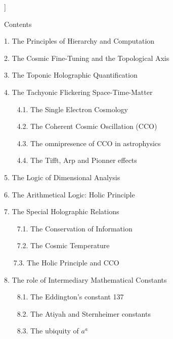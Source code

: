 \documentclass[twoside,draft]{article}
\begin{document}
\begin{sloppypar}
\begin{center}
{{%

}}\smallskip
\end{center}]{%


\setcounter{section}{0}
\setcounter{equation}{0}
\setcounter{figure}{0}
\setcounter{table}{0}
\setcounter{page}{1}


Contents

1. The Principles of Hierarchy and Computation

2. The Cosmic Fine-Tuning and the Topological Axis

3. The Toponic Holographic Quantification

4. The Tachyonic Flickering Space-Time-Matter}

~~~   4.1. The Single Electron Cosmology
   
~~~    4.2. The Coherent Cosmic Oscillation (CCO)
   
~~~    4.3. The omnipresence of CCO in astrophysics
   
~~~    4.4. The Tifft, Arp and Pionner effects
   
5. The Logic of Dimensional Analysis

6. The Arithmetical Logic: Holic Principle

7. The Special Holographic Relations

~~~    7.1. The Conservation of Information
   
~~~    7.2. The Cosmic Temperature

~~     7.3. The Holic Principle and CCO 
    
8. The role of Intermediary Mathematical Constants

~~~    8.1. The Eddington's constant 137
   
~~~    8.2. The Atiyah and Sternheimer constants
   
~~~    8.3. The ubiquity of $a^a$
   

\end{sloppypar}
\end{document}
